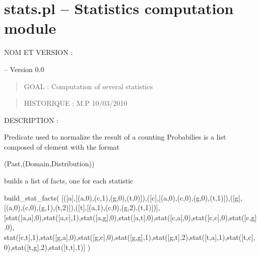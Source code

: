 


\section{stats.pl -- Statistics computation module}

\label{sec:stats}

NOM ET VERSION :

 -- Version 0.0

\begin{quote}
GOAL :
Computation of several statistics
\end{quote}

\begin{quote}
HISTORIQUE :
M.P 10/03/2010
\end{quote}

DESCRIPTION :\vspace{0.7cm}

\begin{description}
Predicate used to normalize the result of a counting
Probabilies is a list composed of element with the format

\begin{code}
(Past,(Domain,Distribution))
\end{code}

builds a list of facts, one for each statistic

\begin{code}
build_stat_facts(
      [([a],[(a,0),(c,1),(g,0),(t,0)]),([c],[(a,0),(c,0),(g,0),(t,1)]),([g],[(a,0),(c,0),(g,1),(t,2)]),([t],[(a,1),(c,0),(g,2),(t,1)])],
      [stat([a,a],0),stat([a,c],1),stat([a,g],0),stat([a,t],0),stat([c,a],0),stat([c,c],0),stat([c,g],0),
       stat([c,t],1),stat([g,a],0),stat([g,c],0),stat([g,g],1),stat([g,t],2),stat([t,a],1),stat([t,c],0),stat([t,g],2),stat([t,t],1)]
      )
\end{code}

\end{description}

